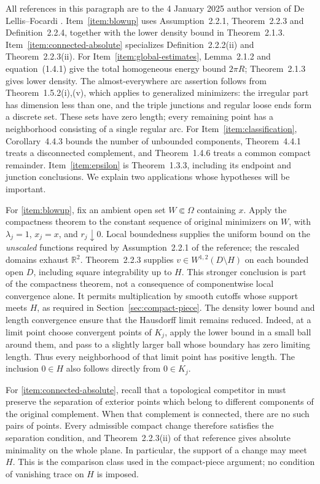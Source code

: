 All references in this paragraph are to the 4 January 2025 author version
of De Lellis--Focardi \cite{delellis_focardi2025}.
Item~\ref{item:blowup} uses Assumption~2.2.1, Theorem~2.2.3 and
Definition~2.2.4, together with the lower density bound in Theorem~2.1.3.
Item~\ref{item:connected-absolute} specializes Definition~2.2.2(ii) and
Theorem~2.2.3(ii). For Item~\ref{item:global-estimates}, Lemma~2.1.2 and
equation~(1.4.1) give the total homogeneous energy bound $2\pi R$;
Theorem~2.1.3 gives lower density. The almost-everywhere arc assertion
follows from Theorem~1.5.2(i),(v), which applies to generalized minimizers:
the irregular part has dimension less than one, and the triple junctions
and regular loose ends form a discrete set. These sets have zero length;
every remaining point has a neighborhood consisting of a single regular arc.
For Item~\ref{item:classification}, Corollary~4.4.3 bounds the number of
unbounded components, Theorem~4.4.1 treats a disconnected complement,
and Theorem~1.4.6 treats a common compact remainder.
Item~\ref{item:epsilon} is Theorem~1.3.3, including its endpoint and
junction conclusions. We explain two applications whose hypotheses will
be important.

For \ref{item:blowup}, fix an ambient open set $W\Subset\Omega$ containing
$x$.  Apply the compactness theorem to the constant sequence of original
minimizers on $W$, with $\lambda_j=1$, $x_j=x$, and $r_j\downarrow0$.
Local boundedness supplies the uniform bound on the \emph{unscaled} functions
required by Assumption~2.2.1 of the reference; the rescaled domains exhaust
$\mathbb R^2$. Theorem~2.2.3 supplies $v\in W^{1,2}(D\setminus H)$
on each bounded open $D$, including square integrability up to $H$. This
stronger conclusion is part of the compactness theorem, not a consequence
of componentwise local convergence alone. It permits multiplication by smooth
cutoffs whose support meets $H$, as required in Section~\ref{sec:compact-piece}.
The density lower bound and length convergence ensure that the
Hausdorff limit remains reduced.  Indeed, at a limit point choose convergent
points of $K_j$, apply the lower bound in a small ball around them, and pass to
a slightly larger ball whose boundary has zero limiting length.  Thus every
neighborhood of that limit point has positive length.  The inclusion $0\in H$
also follows directly from $0\in K_j$.

For \ref{item:connected-absolute}, recall that a topological competitor in
\cite[Definition~2.2.2]{delellis_focardi2025} must preserve the separation
of exterior points which belong to different components of the original
complement. When that complement is connected, there are no such pairs
of points. Every admissible compact change therefore satisfies the
separation condition, and Theorem~2.2.3(ii) of that reference gives absolute
minimality on the whole plane. In particular, the support of a change may
meet $H$. This is the comparison class used in the compact-piece argument;
no condition of vanishing trace on $H$ is imposed.
